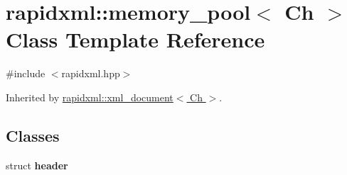 \hypertarget{classrapidxml_1_1memory__pool}{\section{rapidxml\-:\-:memory\-\_\-pool$<$ Ch $>$ Class Template Reference}
\label{classrapidxml_1_1memory__pool}
}


{\ttfamily \#include $<$rapidxml.\-hpp$>$}



Inherited by \hyperlink{classrapidxml_1_1xml__document}{rapidxml\-::xml\-\_\-document$<$ Ch $>$}.

\subsection*{Classes}
\begin{DoxyCompactItemize}
\item 
struct {\bfseries header}
\end{DoxyCompactItemize}
